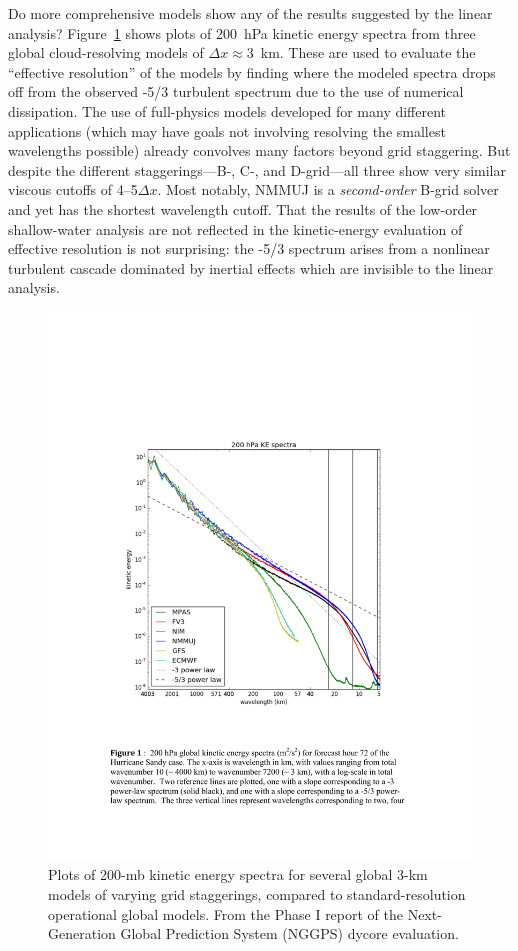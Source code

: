 \documentclass[10pt,letterpaper,margin=1in]{memoir}
\begin{document}
Do more comprehensive models show any of the results suggested by the linear analysis? Figure~\ref{fig:NGGPSspectra} shows plots of 200~hPa kinetic energy spectra from three global cloud-resolving models of $\Delta x \approx 3$~km. These are used to evaluate the ``effective resolution''  \citep{Skamarock2004} of the models by finding where the modeled spectra drops off from the observed \citet{NastromGage1985} -5/3 turbulent spectrum due to the use of numerical dissipation. The use of full-physics models developed for many different applications (which may have goals not involving resolving the smallest wavelengths possible) already convolves many factors beyond grid staggering. But despite the different staggerings---B-, C-, and D-grid---all three show very similar viscous cutoffs of 4--5$\Delta x$. Most notably, NMMUJ is a \textit{second-order} B-grid solver and yet has the shortest wavelength cutoff. That the results of the low-order shallow-water analysis are not reflected in the kinetic-energy evaluation of effective resolution is not surprising: the -5/3 spectrum arises from a nonlinear turbulent cascade dominated by inertial effects which are invisible to the linear analysis. 
\begin{figure}[htbp]
   \centering
   \includegraphics[scale=0.8]{KESpectra.pdf} 
   \caption{Plots of 200-mb kinetic energy spectra for several global 3-km models of varying grid staggerings, compared to standard-resolution operational global models. From the Phase I report of the Next-Generation Global Prediction System (NGGPS) dycore evaluation.}
   \label{fig:NGGPSspectra}
\end{figure}
\end{document}
